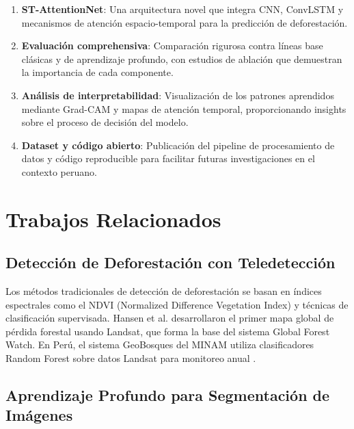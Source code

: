\documentclass[conference]{IEEEtran}
\begin{document}
\begin{enumerate}
    \item \textbf{ST-AttentionNet}: Una arquitectura novel que integra CNN, ConvLSTM y mecanismos de atención espacio-temporal para la predicción de deforestación.

    \item \textbf{Evaluación comprehensiva}: Comparación rigurosa contra líneas base clásicas y de aprendizaje profundo, con estudios de ablación que demuestran la importancia de cada componente.

    \item \textbf{Análisis de interpretabilidad}: Visualización de los patrones aprendidos mediante Grad-CAM y mapas de atención temporal, proporcionando insights sobre el proceso de decisión del modelo.

    \item \textbf{Dataset y código abierto}: Publicación del pipeline de procesamiento de datos y código reproducible para facilitar futuras investigaciones en el contexto peruano.
\end{enumerate}

\section{Trabajos Relacionados}

\subsection{Detección de Deforestación con Teledetección}

Los métodos tradicionales de detección de deforestación se basan en índices espectrales como el NDVI (Normalized Difference Vegetation Index) y técnicas de clasificación supervisada. Hansen et al. \cite{hansen2013high} desarrollaron el primer mapa global de pérdida forestal usando Landsat, que forma la base del sistema Global Forest Watch. En Perú, el sistema GeoBosques del MINAM utiliza clasificadores Random Forest sobre datos Landsat para monitoreo anual \cite{geobosques2020}.

\subsection{Aprendizaje Profundo para Segmentación de Imágenes}
\end{document}
